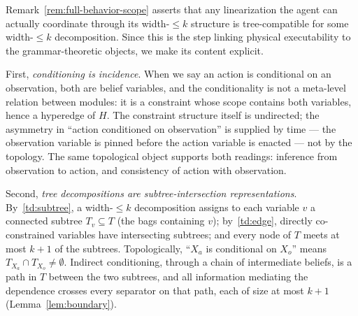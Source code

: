 \documentclass[runningheads]{llncs}
\begin{document}
\begin{remark}\label{rem:topology}
Remark~\ref{rem:full-behavior-scope} asserts that any linearization the agent can actually coordinate through its width-$\leq k$ structure is tree-compatible for some width-$\leq k$ decomposition.
Since this is the step linking physical executability to the grammar-theoretic objects, we make its content explicit.

First, \emph{conditioning is incidence}.
When we say an action is conditional on an observation, both are belief variables, and the conditionality is not a meta-level relation between modules: it is a constraint whose scope contains both variables, hence a hyperedge of $H$.
The constraint structure itself is undirected; the asymmetry in ``action conditioned on observation'' is supplied by time --- the observation variable is pinned before the action variable is enacted --- not by the topology.
The same topological object supports both readings: inference from observation to action, and consistency of action with observation.

Second, \emph{tree decompositions are subtree-intersection representations}.
By~\ref{td:subtree}, a width-$\leq k$ decomposition assigns to each variable $v$ a connected subtree $T_v \subseteq T$ (the bags containing $v$); by~\ref{td:edge}, directly co-constrained variables have intersecting subtrees; and every node of $T$ meets at most $k+1$ of the subtrees.
Topologically, ``$X_a$ is conditional on $X_o$'' means $T_{X_a} \cap T_{X_o} \neq \emptyset$.
Indirect conditioning, through a chain of intermediate beliefs, is a path in $T$ between the two subtrees, and all information mediating the dependence crosses every separator on that path, each of size at most $k+1$ (Lemma~\ref{lem:boundary}).


\end{remark}
\end{document}
